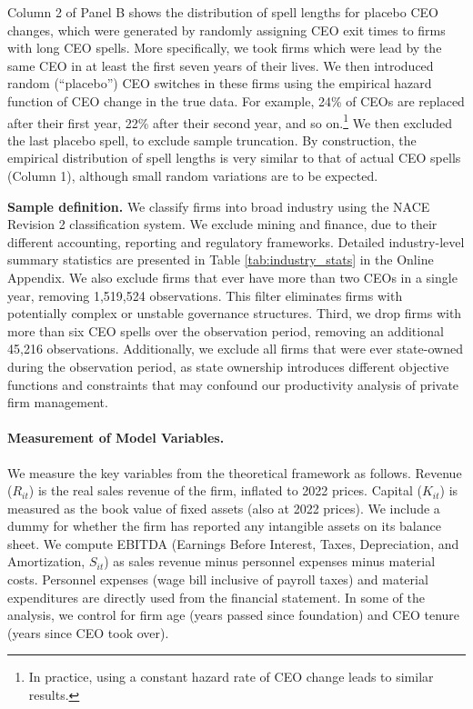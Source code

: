\documentclass[11pt,a4paper]{article}
\begin{document}
Column 2 of Panel B shows the distribution of spell lengths for placebo CEO changes, which were generated by randomly assigning CEO exit times to firms with long CEO spells. More specifically, we took firms which were lead by the same CEO in at least the first seven years of their lives. We then introduced random (``placebo'') CEO switches in these firms using the empirical hazard function of CEO change in the true data. For example, 24\% of CEOs are replaced after their first year, 22\% after their second year, and so on.\footnote{In practice, using a constant hazard rate of CEO change leads to similar results.} We then excluded the last placebo spell, to exclude sample truncation. By construction, the empirical distribution of spell lengths is very similar to that of actual CEO spells (Column 1), although small random variations are to be expected.

\textbf{Sample definition.} 
We classify firms into broad industry using the NACE Revision 2 classification system. We exclude mining and finance, due to their different accounting, reporting and regulatory frameworks. Detailed industry-level summary statistics are presented in Table \ref{tab:industry_stats} in the Online Appendix. We also exclude firms that ever have more than two CEOs in a single year, removing 1,519,524 observations. This filter eliminates firms with potentially complex or unstable governance structures. Third, we drop firms with more than six CEO spells over the observation period, removing an additional 45,216 observations. Additionally, we exclude all firms that were ever state-owned during the observation period, as state ownership introduces different objective functions and constraints that may confound our productivity analysis of private firm management.

\paragraph{Measurement of Model Variables.} We measure the key variables from the theoretical framework as follows. Revenue ($R_{it}$) is the real sales revenue of the firm, inflated to 2022 prices. Capital ($K_{it}$) is measured as the book value of fixed assets (also at 2022 prices). We include a dummy for whether the firm has reported any intangible assets on its balance sheet. We compute EBITDA (Earnings Before Interest, Taxes, Depreciation, and Amortization, $S_{it}$) as sales revenue minus personnel expenses minus material costs. Personnel expenses (wage bill inclusive of payroll taxes) and material expenditures are directly used from the financial statement. In some of the analysis, we control for firm age (years passed since foundation) and CEO tenure (years since CEO took over).
\end{document}
